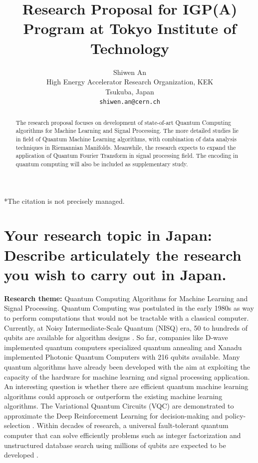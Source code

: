 \documentclass{article}
\title{Research Proposal for IGP(A) Program at Tokyo 
Institute of Technology}
\author{
 Shiwen An \\
 High Energy Accelerator Research Organization, KEK \\
  Tsukuba, Japan \\
  \texttt{shiwen.an@cern.ch} \\
}
\begin{document}
\maketitle
\begin{abstract}
The research proposal focuses on development of 
state-of-art Quantum Computing algorithms for Machine Learning 
and Signal Processing. The more detailed 
studies lie in field of Quantum Machine Learning algorithms, with combination 
of data analysis techniques in Riemannian Manifolds. Meanwhile, the research 
expects to expand the application of Quantum Fourier Transform in signal 
processing field. The encoding in quantum computing will also be 
included as supplementary study. 
\end{abstract}


*The citation is not precisely managed. 

\section{Your research topic in Japan:
Describe articulately the research you wish
to carry out in Japan.}
\textbf{Research theme:} Quantum Computing Algorithms for 
Machine Learning and Signal Processing.  \newline 
\newline
Quantum Computing was postulated in the early 1980s as way to 
perform computations that would not be tractable with a classical 
computer. Currently, at Noisy Intermediate-Scale Quantum (NISQ)
era, 50 to hundreds of qubits are available for algorithm designs \cite{aps_review}.
So far, companies like D-wave implemented quantum computers specialized 
quantum annealing and Xanadu implemented Photonic Quantum Computers with 
216 qubits available. 
Many quantum algorithms have already been  
developed with the aim at exploiting the capacity of the 
hardware for machine learning and signal processing application. 
An interesting question is whether there are efficient 
quantum machine learning algorithms could approach or outperform the 
existing machine learning algorithms. 
The Variational Quantum Circuits (VQC) are demonstrated to 
approximate the Deep Reinforcement Learning for decision-making 
and policy-selection \cite{ieee_vqc}. 
Within decades of research, a universal fault-tolerant 
quantum computer that can solve efficiently problems such 
as integer factorization and unstructured database search using 
millions of qubits are expected to be developed \cite{qml_hep}. 
\end{document}
